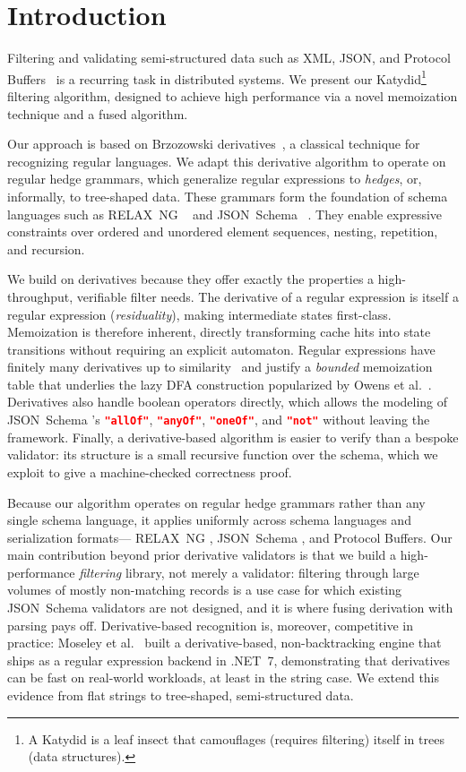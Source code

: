 \documentclass[runningheads]{llncs}
\newcommand{\RelaxNG}{%
  RELAX~NG\xspace%
}
\newcommand{\JSONSchema}{%
  JSON~Schema\xspace%
}
\newcommand{\DFA}{\ac{DFA}\xspace}
\newcommand{\JSON}{\ac{JSON}\xspace}
\newcommand{\XML}{\ac{XML}\xspace}
\begin{document}
\section{Introduction}

Filtering and validating semi-structured data such as \XML, \JSON, and Protocol Buffers~\cite{protobuf} is a recurring task in distributed systems.
We present our Katydid\footnote{A Katydid is a leaf insect that camouflages (requires filtering) itself in trees (data structures).} filtering algorithm, designed to achieve high performance via a novel memoization technique and a fused algorithm.

Our approach is based on Brzozowski derivatives~\cite{brzozowski1964derivatives}, a classical technique for recognizing regular languages.
We adapt this derivative algorithm to operate on regular hedge grammars, which generalize regular expressions to \emph{hedges}, or, informally, to tree-shaped data. 
These grammars form the foundation of schema languages such as \RelaxNG~\cite{hosoya2010foundations} and \JSONSchema~\cite{jsonschemafoundations}.
They enable expressive constraints over ordered and unordered element sequences, nesting, repetition, and recursion.

We build on derivatives because they offer exactly the properties a high-throughput, verifiable filter needs.
The derivative of a regular expression is itself a regular expression (\emph{residuality}), making intermediate states first-class. Memoization is therefore inherent, directly transforming cache hits into state transitions without requiring an explicit automaton.
Regular expressions have finitely many derivatives up to similarity~\cite{brzozowski1964derivatives,symbolicfinite} and justify a \emph{bounded} memoization table that underlies the lazy \DFA construction popularized by Owens et al.~\cite{reexamined}.
Derivatives also handle boolean operators directly, which allows the modeling of \JSONSchema's \lstinline[language=json]|"allOf"|, \lstinline[language=json]|"anyOf"|, \lstinline[language=json]|"oneOf"|, and \lstinline[language=json]|"not"| without leaving the framework.
Finally, a derivative-based algorithm is easier to verify than a bespoke validator: its structure is a small recursive function over the schema, which we exploit to give a machine-checked correctness proof.

Because our algorithm operates on regular hedge grammars rather than any single schema language, it applies uniformly across schema languages and serialization formats—\RelaxNG, \JSONSchema, and Protocol Buffers.
Our main contribution beyond prior derivative validators is that we build a high-performance \emph{filtering} library, not merely a validator: filtering through large volumes of mostly non-matching records is a use case for which existing \JSONSchema validators are not designed, and it is where fusing derivation with parsing pays off.
Derivative-based recognition is, moreover, competitive in practice: Moseley et al.~\cite{nonbacktracking} built a derivative-based, non-backtracking engine that ships as a regular expression backend in .NET~7, demonstrating that derivatives can be fast on real-world workloads, at least in the string case.
We extend this evidence from flat strings to tree-shaped, semi-structured data.
\end{document}
